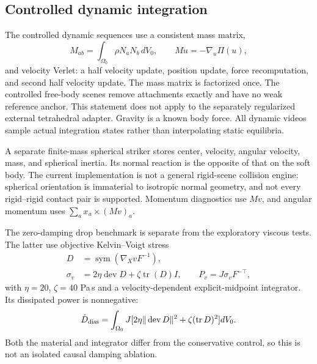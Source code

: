 \documentclass[10pt,twocolumn,letterpaper]{article}
\newcommand{\tr}{\operatorname{tr}}
\newcommand{\dev}{\operatorname{dev}}
\begin{document}
\subsection{Controlled dynamic integration}
The controlled dynamic sequences use a consistent mass matrix,
\begin{equation}
 M_{ab}=\int_{\Omega_0}\rho N_aN_b\,dV_0,\qquad M\ddot u=-\nabla_u\Pi(u),
\end{equation}
and velocity Verlet: a half velocity update, position update, force recomputation, and second half velocity update. The mass matrix is factorized once. The controlled free-body scenes remove attachments exactly and have no weak reference anchor. This statement does not apply to the separately regularized external tetrahedral adapter. Gravity is a known body force. All dynamic videos sample actual integration states rather than interpolating static equilibria.

A separate finite-mass spherical striker stores center, velocity, angular velocity, mass, and spherical inertia. Its normal reaction is the opposite of that on the soft body. The current implementation is not a general rigid-scene collision engine: spherical orientation is immaterial to isotropic normal geometry, and not every rigid--rigid contact pair is supported. Momentum diagnostics use $Mv$, and angular momentum uses $\sum_a x_a\times(Mv)_a$.

The zero-damping drop benchmark is separate from the exploratory viscous tests. The latter use objective Kelvin--Voigt stress
\begin{align}
 D&=\operatorname{sym}(\nabla_XvF^{-1}),\\
 \sigma_v&=2\eta\dev D+\zeta\tr(D)I,\qquad P_v=J\sigma_vF^{-\top},
\end{align}
with $\eta=20$, $\zeta=40$ Pa\,s and a velocity-dependent explicit-midpoint integrator. Its dissipated power is nonnegative:
\begin{equation}
 \dot D_{\rm diss}=\int_{\Omega_0}J[2\eta\|\dev D\|^2+\zeta(\tr D)^2]dV_0.
\end{equation}
Both the material and integrator differ from the conservative control, so this is not an isolated causal damping ablation.
\end{document}
